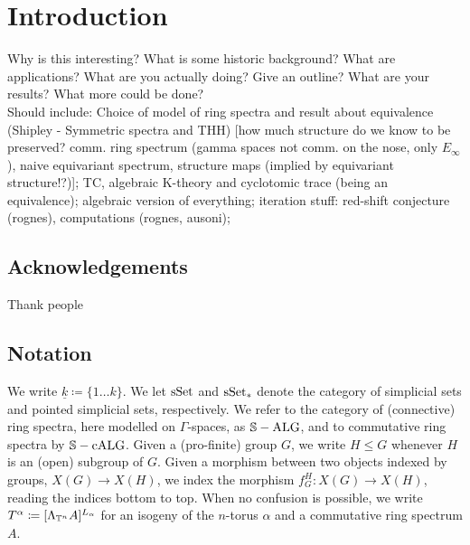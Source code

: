 \section{Introduction}
Why is this interesting? What is some historic background? What are applications? What are you actually doing? Give an outline? What are your results? What more could be done?\\
Should include: Choice of model of ring spectra and result about equivalence (Shipley - Symmetric spectra and THH) [how much structure do we know to be preserved? comm. ring spectrum (gamma spaces not comm. on the nose, only $E_\infty$), naive equivariant spectrum, structure maps (implied by equivariant structure!?)]; TC, algebraic K-theory and cyclotomic trace (being an equivalence); algebraic version of everything; iteration stuff: red-shift conjecture (rognes), computations (rognes, ausoni);
\subsection{Acknowledgements}
Thank people %
\subsection{Notation}
We write $\underline{k} \coloneqq \{1 \ldots k \}$. We let $\mathrm{sSet}$ and $\mathrm{sSet}_*$ denote the category of simplicial sets and pointed simplicial sets, respectively. We refer to the category of (connective) ring spectra, here modelled on $\Gamma$-spaces, as $\mathbb{S}-\mathrm{ALG}$, and to commutative ring spectra by $\mathbb{S}-\mathrm{cALG}$. Given a (pro-finite) group $G$, we write $H \leq G$ whenever $H$ is an (open) subgroup of $G$. Given a morphism between two objects indexed by groups, $X(G) \to X(H)$, we index the morphism $f_G^H: X(G) \to X(H)$, reading the indices bottom to top. When no confusion is possible, we write $T^\alpha \coloneqq [\Lambda_{\mathbb{T}^n} A]^{L_\alpha}$ for an isogeny of the $n$-torus $\alpha$ and a commutative ring spectrum $A$.
